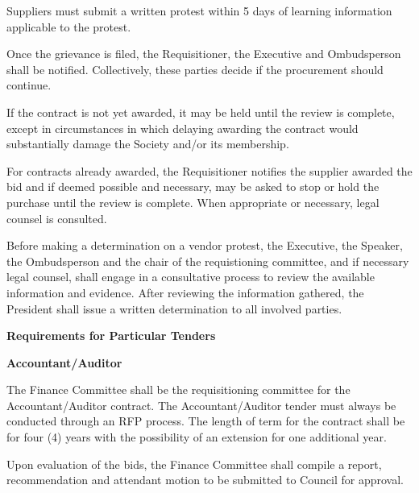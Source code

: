 \begin{longenum}[label*=\thesection.\arabic*., align=left]
\begin{longenum} [label*=\arabic*., align=left]
\item Suppliers must submit a written protest within 5 days of learning information applicable to the protest.

\item Once the grievance is filed, the Requisitioner, the Executive and Ombudsperson shall be notified. Collectively, these parties decide if the procurement should continue. 

\item If the contract is not yet awarded, it may be held until the review is complete, except in circumstances in which delaying awarding the contract would substantially damage the Society and/or its membership. 

\item For contracts already awarded, the Requisitioner notifies the supplier awarded the bid and if deemed possible and necessary, may be asked to stop or hold the purchase until the review is complete. When appropriate or necessary, legal counsel is consulted.

\item Before making a determination on a vendor protest, the Executive, the Speaker, the Ombudsperson and the chair of the requistioning committee, and if necessary legal counsel, shall engage in a consultative process to review the available information and evidence. After reviewing the information gathered, the President shall issue a written determination to all involved parties.
\end{longenum}

\item \textbf{Requirements for Particular Tenders}

\begin{longenum} [label*=\arabic*., align=left]
		\item  \textbf{Accountant/Auditor}
		\begin{longenum} [label*=\arabic*., align=left]
			\item The Finance Committee shall be the requisitioning committee for the Accountant/Auditor contract. The Accountant/Auditor tender must always be conducted through an RFP process. The length of term for the contract shall be for four (4) years with the possibility of an extension for one additional year.
			
			\item Upon evaluation of the bids, the Finance Committee shall compile a report, recommendation and attendant motion to be submitted to Council for approval. 
			

\end{longenum}
\end{longenum}
\end{longenum}
